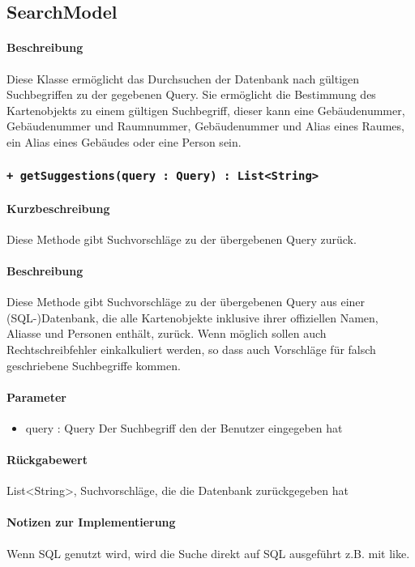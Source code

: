 \subsection{SearchModel}
\paragraph*{Beschreibung}
Diese Klasse ermöglicht das Durchsuchen der Datenbank nach gültigen Suchbegriffen zu der gegebenen Query.
Sie ermöglicht die Bestimmung des Kartenobjekts zu einem gültigen Suchbegriff, 
dieser kann eine Gebäudenummer, Gebäudenummer und Raumnummer, Gebäudenummer und Alias eines Raumes, ein Alias eines Gebäudes oder eine Person sein.

\subsubsection{\texttt{+ getSuggestions(query : Query) : List<String>}}%
\paragraph*{Kurzbeschreibung}
Diese Methode gibt Suchvorschläge zu der übergebenen Query zurück.
\paragraph*{Beschreibung}
Diese Methode gibt Suchvorschläge zu der übergebenen Query aus einer (SQL-)Datenbank, 
die alle Kartenobjekte inklusive ihrer offiziellen Namen, Aliasse und Personen enthält, zurück.
Wenn möglich sollen auch Rechtschreibfehler einkalkuliert werden, so dass auch Vorschläge für falsch geschriebene Suchbegriffe kommen.
\paragraph*{Parameter}
\begin{itemize}
    \item query : Query Der Suchbegriff den der Benutzer eingegeben hat
\end{itemize}
\paragraph*{Rückgabewert}
List<String>, Suchvorschläge, die die Datenbank zurückgegeben hat
\paragraph*{Notizen zur Implementierung}
Wenn SQL genutzt wird, wird die Suche direkt auf SQL ausgeführt z.B. mit \dq like\dq{}.

